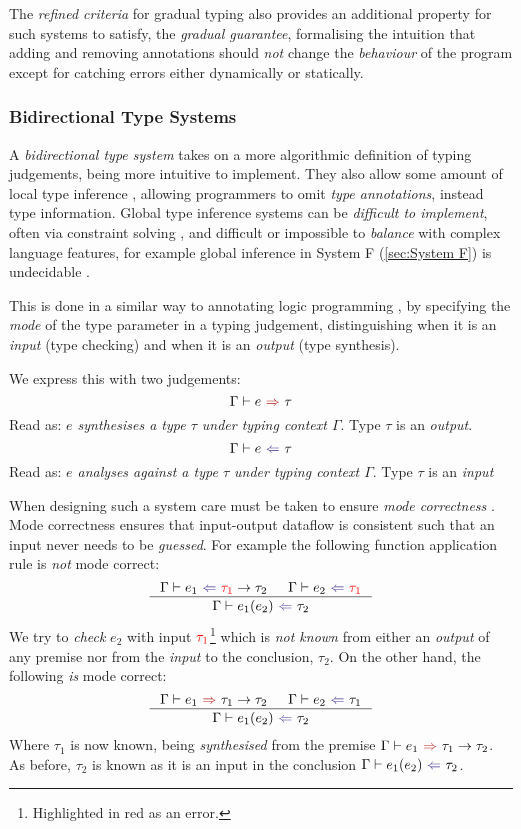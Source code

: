 The \textit{refined criteria} for gradual typing \cite{GradualRefined} also provides an additional property for such systems to satisfy, the \textit{gradual guarantee}, formalising the intuition that adding and removing annotations should \textit{not} change the \textit{behaviour} of the program except for catching errors either dynamically or statically.

\subsubsection{Bidirectional Type Systems}\label{sec:BidirectionalTypeSystem}
A \textit{bidirectional type system} \cite{BidirectionalTypes} takes on a more algorithmic definition of typing judgements, being more intuitive to implement. They also allow some amount of local type inference \cite{LocalInference}, allowing programmers to omit \textit{type annotations}, instead type information. Global type inference systems \cite[ch. 22]{TAPL} can be \textit{difficult to implement}, often via constraint solving \cite[ch. 10]{ATTAPL}, and difficult or impossible to \textit{balance} with complex language features, for example global inference in System F (\ref{sec:System F}) is undecidable \cite{SystemFUndecidable}.

This is done in a similar way to annotating logic programming  \cite[123]{LogicProg}, by specifying the \textit{mode} of the type parameter in a typing judgement, distinguishing when it is an \textit{input} (type checking) and when it is an \textit{output} (type synthesis).

We express this with two judgements:
\[\synthesis{e}{\tau}\]
Read as: \textit{$e$ synthesises a type $\tau$ under typing context $\Gamma$}. Type $\tau$ is an \textit{output}.
\[\analysis{e}{\tau}\]
Read as: \textit{$e$ analyses against a type $\tau$ under typing context $\Gamma$}. Type $\tau$ is an \textit{input}

When designing such a system care must be taken to ensure \textit{mode correctness} \cite{ModeCorrectness}. Mode correctness ensures that input-output dataflow is consistent such that an input never needs to be \textit{guessed}. For example the following function application rule is \textit{not} mode correct:
\[\inference{\analysis{e_1}{{\color{red}\tau_1} \to \tau_2} & \analysis{e_2}{{\color{red}\tau_1}}}{\analysis{e_1(e_2)}{\tau_2}}\]
We try to \textit{check} $e_2$ with input ${\color{red}\tau_1}$\footnote{Highlighted in red as an error.} which is \textit{not known} from either an \textit{output} of any premise nor from the \textit{input} to the conclusion, $\tau_2$. On the other hand, the following \textit{is} mode correct:
\[\inference{\synthesis{e_1}{\tau_1 \to \tau_2} & \analysis{e_2}{\tau_1}}{\analysis{e_1(e_2)}{\tau_2}}\]
Where $\tau_1$ is now known, being \textit{synthesised} from the premise $\synthesis{e_1}{\tau_1 \to \tau_2}$. As before, $\tau_2$ is known as it is an input in the conclusion $\analysis{e_1(e_2)}{\tau_2}$.

